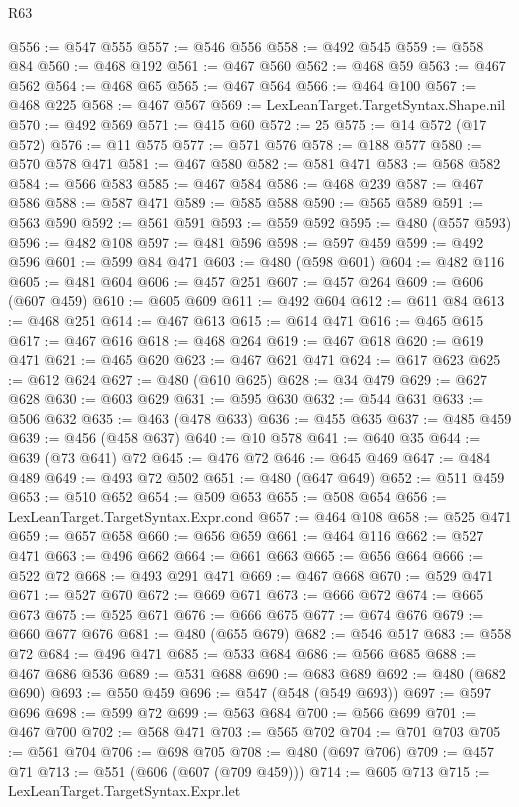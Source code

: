 \begin{lexlean}{R63}
\begin{coremodule}
@556 := @547 @555
@557 := @546 @556
@558 := @492 @545
@559 := @558 @84
@560 := @468 @192
@561 := @467 @560
@562 := @468 @59
@563 := @467 @562
@564 := @468 @65
@565 := @467 @564
@566 := @464 @100
@567 := @468 @225
@568 := @467 @567
@569 := LexLeanTarget.TargetSyntax.Shape.nil
@570 := @492 @569
@571 := @415 @60
@572 := 25
@575 := @14 @572 (@17 @572)
@576 := @11 @575
@577 := @571 @576
@578 := @188 @577
@580 := @570 @578 @471
@581 := @467 @580
@582 := @581 @471
@583 := @568 @582
@584 := @566 @583
@585 := @467 @584
@586 := @468 @239
@587 := @467 @586
@588 := @587 @471
@589 := @585 @588
@590 := @565 @589
@591 := @563 @590
@592 := @561 @591
@593 := @559 @592
@595 := @480 (@557 @593)
@596 := @482 @108
@597 := @481 @596
@598 := @597 @459
@599 := @492 @596
@601 := @599 @84 @471
@603 := @480 (@598 @601)
@604 := @482 @116
@605 := @481 @604
@606 := @457 @251
@607 := @457 @264
@609 := @606 (@607 @459)
@610 := @605 @609
@611 := @492 @604
@612 := @611 @84
@613 := @468 @251
@614 := @467 @613
@615 := @614 @471
@616 := @465 @615
@617 := @467 @616
@618 := @468 @264
@619 := @467 @618
@620 := @619 @471
@621 := @465 @620
@623 := @467 @621 @471
@624 := @617 @623
@625 := @612 @624
@627 := @480 (@610 @625)
@628 := @34 @479
@629 := @627 @628
@630 := @603 @629
@631 := @595 @630
@632 := @544 @631
@633 := @506 @632
@635 := @463 (@478 @633)
@636 := @455 @635
@637 := @485 @459
@639 := @456 (@458 @637)
@640 := @10 @578
@641 := @640 @35
@644 := @639 (@73 @641) @72
@645 := @476 @72
@646 := @645 @469
@647 := @484 @489
@649 := @493 @72 @502
@651 := @480 (@647 @649)
@652 := @511 @459
@653 := @510 @652
@654 := @509 @653
@655 := @508 @654
@656 := LexLeanTarget.TargetSyntax.Expr.cond
@657 := @464 @108
@658 := @525 @471
@659 := @657 @658
@660 := @656 @659
@661 := @464 @116
@662 := @527 @471
@663 := @496 @662
@664 := @661 @663
@665 := @656 @664
@666 := @522 @72
@668 := @493 @291 @471
@669 := @467 @668
@670 := @529 @471
@671 := @527 @670
@672 := @669 @671
@673 := @666 @672
@674 := @665 @673
@675 := @525 @671
@676 := @666 @675
@677 := @674 @676
@679 := @660 @677 @676
@681 := @480 (@655 @679)
@682 := @546 @517
@683 := @558 @72
@684 := @496 @471
@685 := @533 @684
@686 := @566 @685
@688 := @467 @686 @536
@689 := @531 @688
@690 := @683 @689
@692 := @480 (@682 @690)
@693 := @550 @459
@696 := @547 (@548 (@549 @693))
@697 := @597 @696
@698 := @599 @72
@699 := @563 @684
@700 := @566 @699
@701 := @467 @700
@702 := @568 @471
@703 := @565 @702
@704 := @701 @703
@705 := @561 @704
@706 := @698 @705
@708 := @480 (@697 @706)
@709 := @457 @71
@713 := @551 (@606 (@607 (@709 @459)))
@714 := @605 @713
@715 := LexLeanTarget.TargetSyntax.Expr.let

\end{coremodule}
\end{lexlean}
